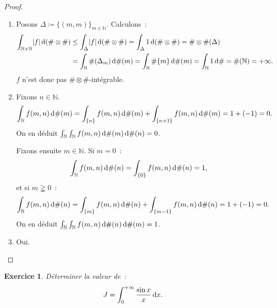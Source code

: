 \documentclass{article}
\newtheorem{ex}{Exercice}[section]
\newcommand{\pinfty}{{+\infty}}
\newcommand{\N}{{\mathbb N}}
\begin{document}
\begin{proof}~
\begin{enumerate}
	\item Posons $\Delta \coloneqq \{(m, m)\}_{m \in \N}$. Calculons~:
	\begin{align*}
		\int_{\N \times \N}\abs f\dif\,(\# \otimes \#) &\leq \int_\Delta\abs f\dif\,(\# \otimes \#) = \int_\Delta 1 \dif\,(\# \otimes \#) = \# \otimes \#(\Delta) \\
			&= \int_\N\#(\Delta_m)\dif\#(m) = \int_\N\#\{m\}\dif\#(m) = \int_\N1\dif\# = \#(\N) = \pinfty.
	\end{align*}
	$f$ n'est donc pas $\# \otimes \#$-intégrable.

	\item Fixons $n \in \N$.
	\[\int_\N f(m, n)\dif\#(m) = \int_{\{n\}}f(m, n)\dif\#(m) + \int_{\{n+1\}}f(m, n)\dif\#(m) = 1 + (-1) = 0.\]
	On en déduit $\int_\N\int_\N f(m,n)\dif\#(m)\dif\#(n) = 0$.

	Fixons ensuite $m \in \N$. Si $m = 0$~:
	\[\int_\N f(m, n)\dif\#(n) = \int_{\{0\}}f(m, n)\dif\#(n) = 1,\]
	et si $m \gneqq 0$~:
	\[\int_\N f(m, n)\dif\#(n) = \int_{\{m\}}f(m, n)\dif\#(n) + \int_{\{m-1\}}f(m, n)\dif\#(n) = 1 + (-1) = 0.\]
	On en déduit $\int_\N\int_\N f(m, n)\dif\#(n)\dif\#(m) = 1$.

	\item Oui.
\end{enumerate}
\end{proof}

\begin{ex} Déterminer la valeur de~:
\[J = \int_0^\pinfty\frac {\sin x}x\dif x.\]
\end{ex}
\end{document}
